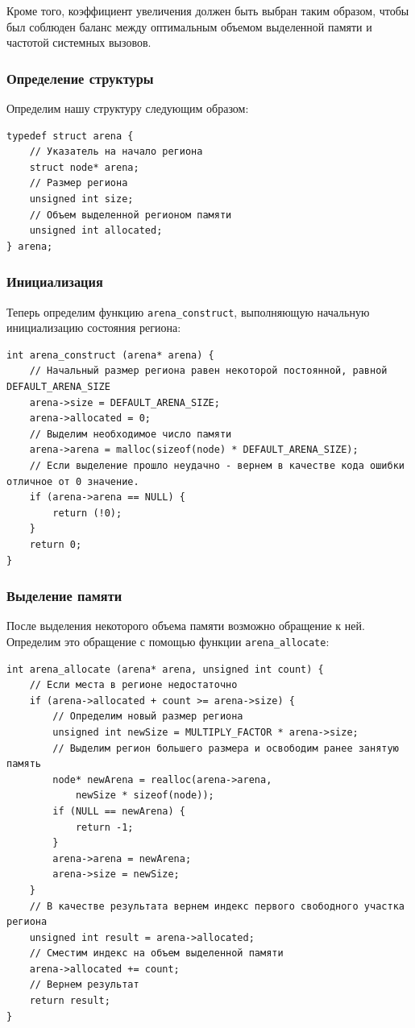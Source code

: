 \documentclass[coursework]{SCWorks}
\begin{document}
Кроме того, коэффициент увеличения должен быть выбран таким образом, чтобы был соблюден баланс между оптимальным объемом выделенной памяти и частотой системных вызовов.

\subsubsection{Определение структуры}

Определим нашу структуру следующим образом:

\begin{verbatim} 
typedef struct arena {
    // Указатель на начало региона
    struct node* arena;
    // Размер региона
    unsigned int size;
    // Объем выделенной регионом памяти
    unsigned int allocated;
} arena;
\end{verbatim}

\subsubsection{Инициализация}

Теперь определим функцию \texttt{arena\_construct}, выполняющую начальную инициализацию состояния региона:

\begin{verbatim}
int arena_construct (arena* arena) {
    // Начальный размер региона равен некоторой постоянной, равной DEFAULT_ARENA_SIZE
    arena->size = DEFAULT_ARENA_SIZE;
    arena->allocated = 0;
    // Выделим необходимое число памяти
    arena->arena = malloc(sizeof(node) * DEFAULT_ARENA_SIZE);
    // Если выделение прошло неудачно - вернем в качестве кода ошибки отличное от 0 значение. 
    if (arena->arena == NULL) {
        return (!0);
    }
    return 0;
}
\end{verbatim}

\subsubsection{Выделение памяти}

После выделения некоторого объема памяти возможно обращение к ней. Определим это обращение с помощью функции \texttt{arena\_allocate}:

\begin{verbatim}
int arena_allocate (arena* arena, unsigned int count) {
    // Если места в регионе недостаточно
    if (arena->allocated + count >= arena->size) {
        // Определим новый размер региона
        unsigned int newSize = MULTIPLY_FACTOR * arena->size;
        // Выделим регион большего размера и освободим ранее занятую память
        node* newArena = realloc(arena->arena,
            newSize * sizeof(node));
        if (NULL == newArena) {
            return -1;
        }
        arena->arena = newArena;
        arena->size = newSize;
    }
    // В качестве результата вернем индекс первого свободного участка региона
    unsigned int result = arena->allocated;
    // Сместим индекс на объем выделенной памяти
    arena->allocated += count;
    // Вернем результат
    return result;
}
\end{verbatim}
\end{document}
